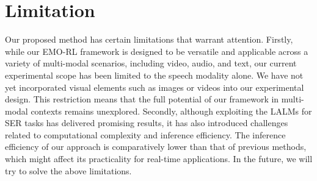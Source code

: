 \documentclass[11pt]{article}
\begin{document}
\section{Limitation}
Our proposed method has certain limitations that warrant attention.
Firstly, while our EMO-RL framework is designed to be versatile and applicable across a variety of multi-modal scenarios, including video, audio, and text, our current experimental scope has been limited to the speech modality alone. We have not yet incorporated visual elements such as images or videos into our experimental design. This restriction means that the full potential of our framework in multi-modal contexts remains unexplored.
Secondly, although exploiting the LALMs for SER tasks has delivered promising results, it has also introduced challenges related to computational complexity and inference efficiency.
The inference efficiency of our approach is comparatively lower than that of previous methods, which might affect its practicality for real-time applications.
In the future, we will try to solve the above limitations.
\end{document}
